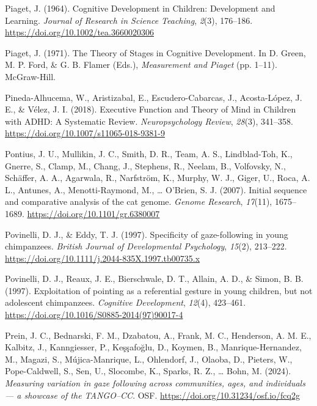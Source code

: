 \documentclass[
]{scrbook}
\newlength{\cslhangindent}
\newenvironment{CSLReferences}[2] %
 {\begin{list}{}{%
  \setlength{\itemindent}{0pt}
  \setlength{\leftmargin}{0pt}
  \setlength{\parsep}{0pt}
  \ifodd #1
   \setlength{\leftmargin}{\cslhangindent}
   \setlength{\itemindent}{-1\cslhangindent}
  \fi
  \setlength{\itemsep}{#2\baselineskip}}}
 {\end{list}}
\begin{document}
\begin{CSLReferences}{1}{0}
Piaget, J. (1964). Cognitive {Development} in {Children}: {Development} and {Learning}. \emph{Journal of Research in Science Teaching}, \emph{2}(3), 176--186. \url{https://doi.org/10.1002/tea.3660020306}

Piaget, J. (1971). The {Theory} of {Stages} in {Cognitive Development}. In D. Green, M. P. Ford, \& G. B. Flamer (Eds.), \emph{Measurement and {Piaget}} (pp. 1--11). McGraw-Hill.

Pineda-Alhucema, W., Aristizabal, E., Escudero-Cabarcas, J., Acosta-López, J. E., \& Vélez, J. I. (2018). Executive {Function} and {Theory} of {Mind} in {Children} with {ADHD}: A {Systematic Review}. \emph{Neuropsychology Review}, \emph{28}(3), 341--358. \url{https://doi.org/10.1007/s11065-018-9381-9}

Pontius, J. U., Mullikin, J. C., Smith, D. R., Team, A. S., Lindblad-Toh, K., Gnerre, S., Clamp, M., Chang, J., Stephens, R., Neelam, B., Volfovsky, N., Schäffer, A. A., Agarwala, R., Narfström, K., Murphy, W. J., Giger, U., Roca, A. L., Antunes, A., Menotti-Raymond, M., \ldots{} O'Brien, S. J. (2007). Initial sequence and comparative analysis of the cat genome. \emph{Genome Research}, \emph{17}(11), 1675--1689. \url{https://doi.org/10.1101/gr.6380007}

Povinelli, D. J., \& Eddy, T. J. (1997). Specificity of gaze-following in young chimpanzees. \emph{British Journal of Developmental Psychology}, \emph{15}(2), 213--222. \url{https://doi.org/10.1111/j.2044-835X.1997.tb00735.x}

Povinelli, D. J., Reaux, J. E., Bierschwale, D. T., Allain, A. D., \& Simon, B. B. (1997). Exploitation of pointing as a referential gesture in young children, but not adolescent chimpanzees. \emph{Cognitive Development}, \emph{12}(4), 423--461. \url{https://doi.org/10.1016/S0885-2014(97)90017-4}

Prein, J. C., Bednarski, F. M., Dzabatou, A., Frank, M. C., Henderson, A. M. E., Kalbitz, J., Kanngiesser, P., Keşşafoğlu, D., Koymen, B., Manrique-Hernandez, M., Magazi, S., Mújica-Manrique, L., Ohlendorf, J., Olaoba, D., Pieters, W., Pope-Caldwell, S., Sen, U., Slocombe, K., Sparks, R. Z., \ldots{} Bohn, M. (2024). \emph{Measuring variation in gaze following across communities, ages, and individuals --- a showcase of the {TANGO}--{CC}}. OSF. \url{https://doi.org/10.31234/osf.io/fcq2g}


\end{CSLReferences}
\end{document}
